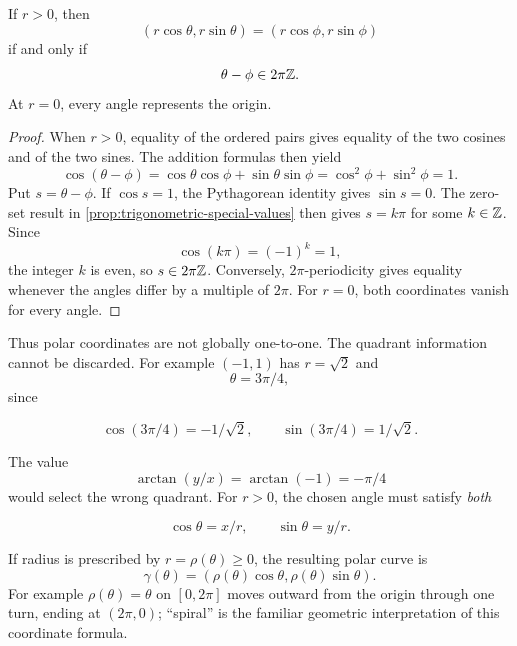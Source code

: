 \begin{proposition}
\label{prop:polar-angle-uniqueness}
If $r>0$, then
\[
(r\cos\theta,r\sin\theta)=(r\cos\phi,r\sin\phi)
\]
if and only if
\[
\theta-\phi\in2\pi\mathbb{Z}.
\]
At $r=0$, every angle represents the origin.
\end{proposition}
\begin{proof}
When $r>0$, equality of the ordered pairs gives equality of the two cosines
and of the two sines. The addition formulas then yield
\[
\cos(\theta-\phi)
=\cos\theta\cos\phi+\sin\theta\sin\phi
=\cos^2\phi+\sin^2\phi=1.
\]
Put \(s=\theta-\phi\). If \(\cos s=1\), the Pythagorean identity gives
\(\sin s=0\). The zero-set result in
\cref{prop:trigonometric-special-values} then gives \(s=k\pi\) for some
\(k\in\mathbb{Z}\). Since
\[
\cos(k\pi)=(-1)^k=1,
\]
the integer \(k\) is even, so \(s\in2\pi\mathbb{Z}\). Conversely,
\(2\pi\)-periodicity gives equality whenever the angles differ by a multiple
of \(2\pi\). For \(r=0\), both coordinates vanish for every angle.
\end{proof}

Thus polar coordinates are not globally one-to-one. The quadrant information
cannot be discarded.
For example $(-1,1)$ has $r=\sqrt2$ and
\[
\theta=3\pi/4,
\]
 since

\[
\cos(3\pi/4)=-1/\sqrt2,\qquad \sin(3\pi/4)=1/\sqrt2.
\]

The value
\[
\arctan(y/x)=\arctan(-1)=-\pi/4
\]
 would select the wrong
quadrant. For $r>0$, the chosen angle must satisfy \emph{both}

\[
\cos\theta=x/r,\qquad \sin\theta=y/r.
\]


If radius is prescribed by $r=\rho(\theta)\geq0$, the resulting polar
curve is
\[
\gamma(\theta)=(\rho(\theta)\cos\theta,\rho(\theta)\sin\theta).
\]
For example $\rho(\theta)=\theta$ on $[0,2\pi]$ moves outward from the
origin through one turn, ending at $(2\pi,0)$; ``spiral'' is the familiar
geometric interpretation of this coordinate formula.

